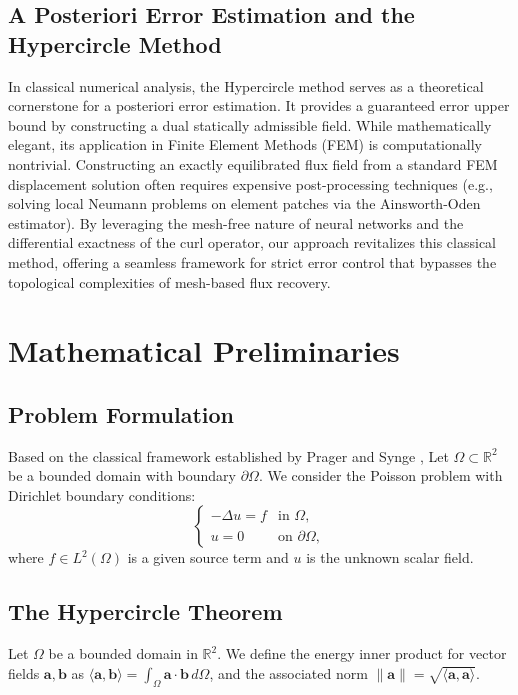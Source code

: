 \documentclass[12pt, a4paper]{article}
\begin{document}
\subsection{A Posteriori Error Estimation and the Hypercircle Method}
In classical numerical analysis, the Hypercircle method \cite{prager1947} serves as a theoretical cornerstone for a posteriori error estimation. It provides a guaranteed error upper bound by constructing a dual statically admissible field. While mathematically elegant, its application in Finite Element Methods (FEM) is computationally nontrivial. Constructing an exactly equilibrated flux field from a standard FEM displacement solution often requires expensive post-processing techniques (e.g., solving local Neumann problems on element patches via the Ainsworth-Oden estimator\cite{ainsworth2000posteriori}). By leveraging the mesh-free nature of neural networks and the differential exactness of the curl operator, our approach revitalizes this classical method, offering a seamless framework for strict error control that bypasses the topological complexities of mesh-based flux recovery.

\section{Mathematical Preliminaries}
\subsection{Problem Formulation}
Based on the classical framework established by Prager and Synge \cite{prager1947}, Let $\Omega \subset \mathbb{R}^2$ be a bounded domain with boundary $\partial \Omega$. We consider the Poisson problem with Dirichlet boundary conditions:
\begin{equation}
    \begin{cases}
    -\Delta u = f & \text{in } \Omega, \\
    u = 0 & \text{on } \partial \Omega,
    \end{cases}
\end{equation}
where $f \in L^2(\Omega)$ is a given source term and $u$ is the unknown scalar field.

\subsection{The Hypercircle Theorem}
Let $\Omega$ be a bounded domain in $\mathbb{R}^2$. We define the energy inner product for vector fields $\mathbf{a}, \mathbf{b}$ as $\langle \mathbf{a}, \mathbf{b} \rangle = \int_{\Omega} \mathbf{a} \cdot \mathbf{b} \, d\Omega$, and the associated norm $\| \mathbf{a} \| = \sqrt{\langle \mathbf{a}, \mathbf{a} \rangle}$.
\end{document}
